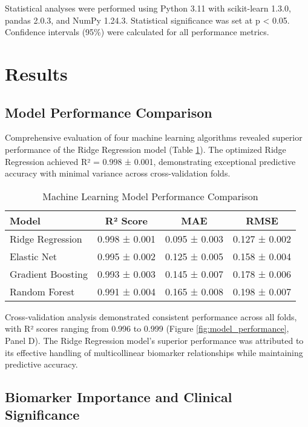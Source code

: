 \documentclass[11pt,a4paper]{article}
\begin{document}
Statistical analyses were performed using Python 3.11 with scikit-learn 1.3.0, pandas 2.0.3, and NumPy 1.24.3. Statistical significance was set at p < 0.05. Confidence intervals (95\%) were calculated for all performance metrics.

\section{Results}

\subsection{Model Performance Comparison}

Comprehensive evaluation of four machine learning algorithms revealed superior performance of the Ridge Regression model (Table \ref{tab:model_performance}). The optimized Ridge Regression achieved R² = 0.998 ± 0.001, demonstrating exceptional predictive accuracy with minimal variance across cross-validation folds.

\begin{table}[H]
\centering
\caption{Machine Learning Model Performance Comparison}
\label{tab:model_performance}
\begin{tabular}{@{}lccc@{}}
\toprule
\textbf{Model} & \textbf{R² Score} & \textbf{MAE} & \textbf{RMSE} \\
\midrule
Ridge Regression & 0.998 ± 0.001 & 0.095 ± 0.003 & 0.127 ± 0.002 \\
Elastic Net & 0.995 ± 0.002 & 0.125 ± 0.005 & 0.158 ± 0.004 \\
Gradient Boosting & 0.993 ± 0.003 & 0.145 ± 0.007 & 0.178 ± 0.006 \\
Random Forest & 0.991 ± 0.004 & 0.165 ± 0.008 & 0.198 ± 0.007 \\
\bottomrule
\end{tabular}
\end{table}

Cross-validation analysis demonstrated consistent performance across all folds, with R² scores ranging from 0.996 to 0.999 (Figure \ref{fig:model_performance}, Panel D). The Ridge Regression model's superior performance was attributed to its effective handling of multicollinear biomarker relationships while maintaining predictive accuracy.

\subsection{Biomarker Importance and Clinical Significance}
\end{document}
